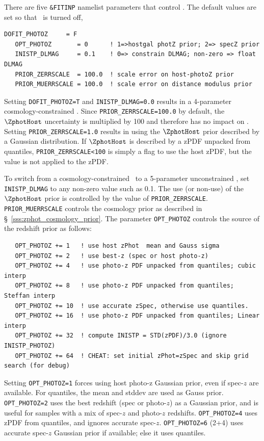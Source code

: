 \documentclass[12pt]{article}
\begin{document}
There are five {\tt \&FITINP} namelist parameters that
control \lcfitz. The default values are set so
that \lcfitz\ is turned off,
%
\begin{Verbatim}[frame=single]
   DOFIT_PHOTOZ     = F
   OPT_PHOTOZ       = 0      ! 1=>hostgal photZ prior; 2=> specZ prior
   INISTP_DLMAG     = 0.1    ! 0=> constrain DLMAG; non-zero => float DLMAG
   PRIOR_ZERRSCALE  = 100.0  ! scale error on host-photoZ prior
   PRIOR_MUERRSCALE = 100.0  ! scale error on distance modulus prior
\end{Verbatim}
%
Setting \verb|DOFIT_PHOTOZ=T| and \verb|INISTP_DLMAG=0.0|
results in a 4-parameter cosmology-constrained \lcfitz.
Since \verb|PRIOR_ZERRSCALE=100.0| by default, the $\ZphotHost$
uncertainty is multiplied by 100 and therefore has no impact on \lcfitz.
Setting \verb|PRIOR_ZERRSCALE=1.0| results in using the $\ZphotHost$
prior described by a Gaussian distribution.
If $\ZphotHost$ is described by a zPDF unpacked from quantiles,
\verb|PRIOR_ZERRSCALE<100| is simply a flag to use the host zPDF,
but the value is not applied to the zPDF.

To switch from a cosmology-constrained \lcfitz\ to a 5-parameter
unconstrained \lcfitz, set \verb|INISTP_DLMAG| to any
non-zero value such as 0.1. The use (or non-use) of the
$\ZphotHost$ prior is controlled by the value of 
\verb|PRIOR_ZERRSCALE|. \verb|PRIOR_MUERRSCALE| controls the
cosmology prior as described in  \S~\ref{sss:zphot_cosmology_prior}.
The parameter \verb|OPT_PHOTOZ| controls the source of
the redshift prior as follows:
%
\begin{verbatim}
   OPT_PHOTOZ += 1   ! use host zPhot  mean and Gauss sigma
   OPT_PHOTOZ += 2   ! use best-z (spec or host photo-z) 
   OPT_PHOTOZ += 4   ! use photo-z PDF unpacked from quantiles; cubic interp
   OPT_PHOTOZ += 8   ! use photo-z PDF unpacked from quantiles; Steffan interp
   OPT_PHOTOZ += 10  ! use accurate zSpec, otherwise use quantiles.
   OPT_PHOTOZ += 16  ! use photo-z PDF unpacked from quantiles; Linear interp 
   OPT_PHOTOZ += 32  ! compute INISTP = STD(zPDF)/3.0 (ignore INISTP_PHOTOZ)
   OPT_PHOTOZ += 64  ! CHEAT: set initial zPhot=zSpec and skip grid search (for debug)
\end{verbatim}
%
Setting {\tt OPT\_PHOTOZ=1} forces using host photo-z Gaussian prior, 
even if spec-$z$ are available. For quantiles, the mean and stddev are used as Gauss prior.
{\tt OPT\_PHOTOZ=2} uses the best redshift (spec or photo-$z$)
as a Gaussian prior, and is useful for samples with a mix of spec-$z$ and 
photo-$z$ redshifts.
%
{\tt OPT\_PHOTOZ=4} uses zPDF from quantiles, and ignores accurate spec-$z$.
{\tt OPT\_PHOTOZ=6} (2+4) uses accurate spec-$z$ Gaussian prior
if available; else it uses quantiles.
\end{document}
